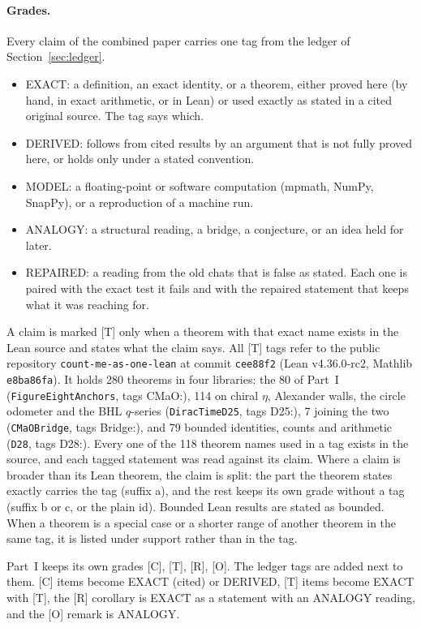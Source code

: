 \documentclass[11pt]{article}
\theoremstyle{definition}
\newcommand{\grade}[1]{\textsf{\small[#1]}}
\begin{document}
\paragraph{Grades.} Every claim of the combined paper carries one tag from the ledger of Section~\ref{sec:ledger}.
\begin{itemize}[leftmargin=2em]
\item \textsf{EXACT}: a definition, an exact identity, or a theorem, either proved here (by hand, in exact arithmetic, or in Lean) or used exactly as stated in a cited original source. The tag says which.
\item \textsf{DERIVED}: follows from cited results by an argument that is not fully proved here, or holds only under a stated convention.
\item \textsf{MODEL}: a floating-point or software computation (mpmath, NumPy, SnapPy), or a reproduction of a machine run.
\item \textsf{ANALOGY}: a structural reading, a bridge, a conjecture, or an idea held for later.
\item \textsf{REPAIRED}: a reading from the old chats that is false as stated. Each one is paired with the exact test it fails and with the repaired statement that keeps what it was reaching for.
\end{itemize}
A claim is marked \textsf{[T]} only when a theorem with that exact name exists in the Lean source and states what the claim says. All \textsf{[T]} tags refer to the public repository \texttt{count-me-as-one-lean} at commit \texttt{cee88f2} (Lean v4.36.0-rc2, Mathlib \texttt{e8ba86fa}). It holds 280 theorems in four libraries: the 80 of Part~I (\texttt{FigureEightAnchors}, tags \textsf{CMaO:}), 114 on chiral $\eta$, Alexander walls, the circle odometer and the BHL $q$-series (\texttt{DiracTimeD25}, tags \textsf{D25:}), 7 joining the two (\texttt{CMaOBridge}, tags \textsf{Bridge:}), and 79 bounded identities, counts and arithmetic (\texttt{D28}, tags \textsf{D28:}). Every one of the 118 theorem names used in a tag exists in the source, and each tagged statement was read against its claim. Where a claim is broader than its Lean theorem, the claim is split: the part the theorem states exactly carries the tag (suffix a), and the rest keeps its own grade without a tag (suffix b or c, or the plain id). Bounded Lean results are stated as bounded. When a theorem is a special case or a shorter range of another theorem in the same tag, it is listed under support rather than in the tag.

Part~I keeps its own grades \grade{C}, \grade{T}, \grade{R}, \grade{O}. The ledger tags are added next to them. \grade{C} items become EXACT (cited) or DERIVED, \grade{T} items become EXACT with \textsf{[T]}, the \grade{R} corollary is EXACT as a statement with an ANALOGY reading, and the \grade{O} remark is ANALOGY.
\end{document}
